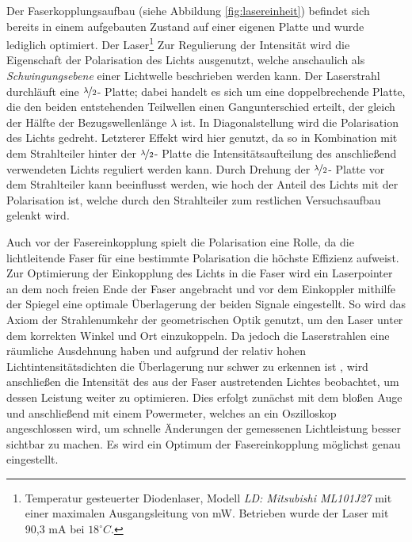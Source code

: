 Der Faserkopplungsaufbau (siehe Abbildung \ref{fig:lasereinheit}) befindet sich bereits in einem aufgebauten Zustand auf einer eigenen Platte und wurde lediglich optimiert. Der Laser\footnote{Temperatur gesteuerter Diodenlaser, Modell  \textit{LD: Mitsubishi ML101J27} mit einer maximalen Ausgangsleitung von \unit[35]{mW}. Betrieben wurde der Laser mit 90,3 mA bei $18^\circ C$.} Zur Regulierung der Intensität wird die Eigenschaft der Polarisation des Lichts ausgenutzt, welche anschaulich als \textit{Schwingungsebene} einer Lichtwelle beschrieben werden kann. Der Laserstrahl durchläuft eine $\nicefrac{\lambda}{2}$- Platte; dabei handelt es sich um eine doppelbrechende Platte, die den beiden entstehenden Teilwellen einen Gangunterschied erteilt, der gleich der Hälfte der Bezugswellenlänge $\lambda$ ist. In Diagonalstellung wird die Polarisation des Lichts gedreht. Letzterer Effekt wird hier genutzt, da so in Kombination mit dem Strahlteiler hinter der  $\nicefrac{\lambda}{2}$- Platte die Intensitätsaufteilung des anschließend verwendeten Lichts reguliert werden kann. Durch Drehung der  $\nicefrac{\lambda}{2}$- Platte vor dem Strahlteiler kann beeinflusst werden, wie hoch der Anteil des Lichts mit der Polarisation ist, welche durch den Strahlteiler zum restlichen Versuchsaufbau gelenkt wird.

Auch vor der Fasereinkopplung spielt die Polarisation eine Rolle, da die lichtleitende Faser für eine bestimmte Polarisation die höchste Effizienz aufweist. \\

Zur Optimierung der Einkopplung des Lichts in die Faser wird ein Laserpointer an dem noch freien Ende der Faser angebracht und vor dem Einkoppler mithilfe der Spiegel eine optimale Überlagerung der beiden Signale eingestellt. So wird das Axiom der Strahlenumkehr der geometrischen Optik genutzt, um den Laser unter dem korrekten Winkel und Ort einzukoppeln. Da jedoch die Laserstrahlen eine räumliche Ausdehnung haben und aufgrund der relativ hohen Lichtintensitätsdichten die Überlagerung nur schwer zu erkennen ist , wird anschließen die Intensität des aus der Faser austretenden Lichtes beobachtet, um dessen Leistung weiter zu optimieren. Dies erfolgt zunächst mit dem bloßen Auge und anschließend mit einem Powermeter, welches an ein Oszilloskop angeschlossen wird, um schnelle Änderungen der gemessenen Lichtleistung besser sichtbar zu machen. Es wird ein Optimum der Fasereinkopplung möglichst genau eingestellt. 

